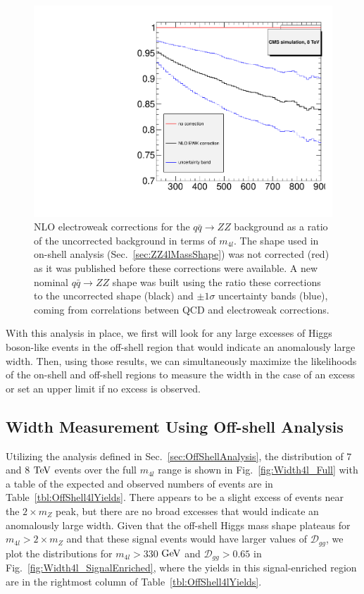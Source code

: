 \begin{figure}[htbp]
\begin{center}
\includegraphics[width=.5\linewidth]{HiggsProperties/figures/EWKcorr_ratio.pdf}
\caption[NLO Electroweak Corrections for $q\bar{q}\rightarrow ZZ$ Background]{NLO electroweak corrections for the $q\bar{q}\rightarrow ZZ$ background as a ratio of the uncorrected background in terms of $m_{4l}$. The shape used in on-shell analysis (Sec.~\ref{sec:ZZ4lMassShape}) was not corrected (red) as it was published before these corrections were available. A new nominal $q\bar{q}\rightarrow ZZ$ shape was built using the ratio these corrections to the uncorrected shape (black) and $\pm1\sigma$ uncertainty bands (blue), coming from correlations between QCD and electroweak corrections.}
\label{fig:qqZZEWKCorrections}
\end{center}
\end{figure}

With this analysis in place, we first will look for any large excesses of Higgs boson-like events in the off-shell region that would indicate an anomalously large width. Then, using those results, we can simultaneously maximize the likelihoods of the on-shell and off-shell regions to measure the width in the case of an excess or set an upper limit if no excess is observed.

\subsection{Width Measurement Using Off-shell Analysis}
\label{sec:WidthResults}

Utilizing the analysis defined in Sec.~\ref{sec:OffShellAnalysis}, the distribution of $7$ and $8$ $\rm{TeV}$ events over the full $m_{4l}$ range is shown in Fig.~\ref{fig:Width4l_Full} with a table of the expected and observed numbers of events are in Table~\ref{tbl:OffShell4lYields}. There appears to be a slight excess of events near the $2\times m_{Z}$ peak, but there are no broad excesses that would indicate an anomalously large width. Given that the off-shell Higgs mass shape plateaus for $m_{4l} > 2\times m_{Z}$ and that these signal events would have larger values of $\mathcal{D}_{gg}$, we plot the distributions for $m_{4l}>330$ $\rm{GeV}$ and $\mathcal{D}_{gg}>0.65$ in Fig.~\ref{fig:Width4l_SignalEnriched}, where the yields in this signal-enriched region are in the rightmost column of Table~\ref{tbl:OffShell4lYields}.

